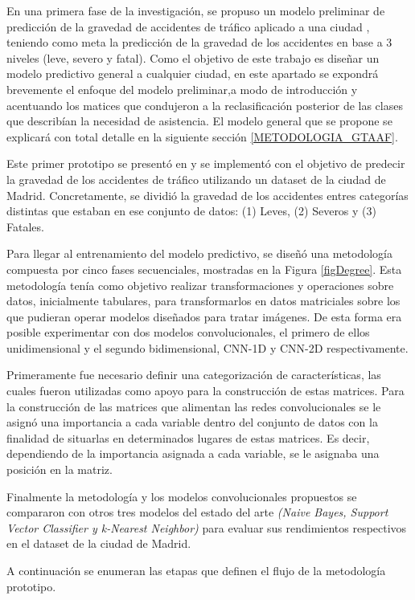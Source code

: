 En una primera fase de la investigación, se propuso un modelo preliminar de predicción de la gravedad de accidentes de tráfico aplicado a una ciudad \cite{PEREZSALA2023113245}, teniendo como meta la predicción de la gravedad de los accidentes en base a 3 niveles (leve, severo y fatal). Como el objetivo de este trabajo es diseñar un modelo predictivo general a cualquier ciudad, en este apartado se expondrá brevemente el enfoque del modelo preliminar,a modo de introducción y acentuando los matices que condujeron a la reclasificación posterior de las clases que describían la necesidad de asistencia. El modelo general que se propone se explicará con total detalle en la siguiente sección \ref{METODOLOGIA_GTAAF}.

Este primer prototipo se presentó en \cite{PEREZSALA2023113245} y se implementó con el objetivo de predecir la gravedad de los accidentes de tráfico utilizando un dataset de la ciudad de Madrid. Concretamente, se dividió la gravedad de los accidentes entres categorías distintas que estaban en ese conjunto de datos: (1) Leves, (2) Severos y (3) Fatales.

Para llegar al entrenamiento del modelo predictivo, se diseñó una metodología compuesta por cinco fases secuenciales, mostradas en la Figura \ref{figDegree}. Esta metodología tenía como objetivo realizar transformaciones y operaciones sobre datos, inicialmente tabulares, para transformarlos en datos matriciales sobre los que pudieran operar modelos diseñados para tratar imágenes. De esta forma era posible experimentar con dos modelos convolucionales, el primero de ellos unidimensional y el segundo bidimensional, CNN-1D y CNN-2D respectivamente.

Primeramente fue necesario definir una categorización de características, las cuales fueron utilizadas como apoyo para la construcción de estas matrices. Para la construcción de las matrices que alimentan las redes convolucionales se le asignó una importancia a cada variable dentro del conjunto de datos con la finalidad de situarlas en determinados lugares de estas matrices. Es decir, dependiendo de la importancia asignada a cada variable, se le asignaba una posición en la matriz. 

Finalmente la metodología y los modelos convolucionales propuestos se compararon con otros tres modelos del estado del arte \textit{(Naive Bayes, Support Vector Classifier y k-Nearest Neighbor)} para evaluar sus rendimientos respectivos en el dataset de la ciudad de Madrid.

A continuación se enumeran las etapas que definen el flujo de la metodología prototipo.

